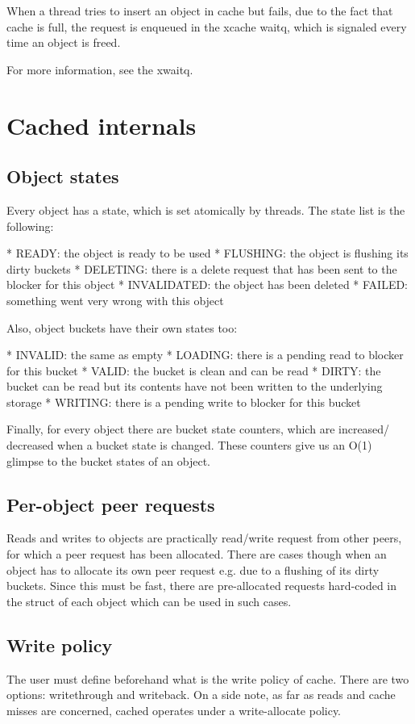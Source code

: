 When a thread tries to insert an object in cache but fails, due to the fact
that cache is full, the request is enqueued in the xcache waitq, which is
signaled every time an object is freed.

For more information, see the xwaitq.

\section{Cached internals}

\subsection{Object states}

Every object has a state, which is set atomically by threads. The state list is
the following:

* READY: the object is ready to be used
* FLUSHING: the object is flushing its dirty buckets
* DELETING: there is a delete request that has been sent to the blocker for
  this object
* INVALIDATED: the object has been deleted
* FAILED: something went very wrong with this object

Also, object buckets have their own states too:

* INVALID: the same as empty
* LOADING: there is a pending read to blocker for this bucket
* VALID: the bucket is clean and can be read
* DIRTY: the bucket can be read but its contents have not been written to the
  underlying storage
* WRITING: there is a pending write to blocker for this bucket

Finally, for every object there are bucket state counters, which are increased/
decreased when a bucket state is changed. These counters give us an O(1)
glimpse to the bucket states of an object.

\subsection{Per-object peer requests}

Reads and writes to objects are practically read/write request from other
peers, for which a peer request has been allocated. There are cases though
when an object has to allocate its own peer request e.g. due to a flushing of
its dirty buckets. Since this must be fast, there are pre-allocated requests
hard-coded in the struct of each object which can be used in such cases.

\subsection{Write policy}

The user must define beforehand what is the write policy of cache. There are
two options: writethrough and writeback. On a side note, as far as reads and
cache misses are concerned, cached operates under a write-allocate policy.

